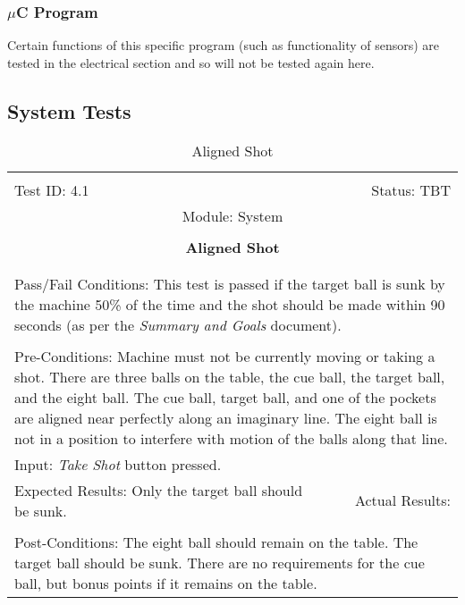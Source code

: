 \documentclass[titlepage]{article}
\begin{document}
\subsubsection{$\mu$C Program}
Certain functions of this specific program (such as functionality of sensors) are tested in the electrical section and so will not be tested again here.



\subsection{System Tests}
\begin{center}%
\begin{table}
\begin{tabular}{|l r|}\hline&\\[-2mm]
	Test ID: 4.1	&Status: TBT\\[-3mm]
	\multicolumn{2}{|c|}{Module: System}\\&\\
	\multicolumn{2}{|c|}{\textbf{\large{Aligned Shot}}}\\&\\\hline&\\[-3mm]
	\multicolumn{2}{|p{\textwidth}|}{Pass/Fail Conditions: This test is passed if the target ball is sunk by the machine 50\% of the time and the shot should be made within 90 seconds (as per the \textit{Summary and Goals} document).}\\[1mm]\hline&\\[-3mm]
	\multicolumn{2}{|p{\textwidth}|}{Pre-Conditions: Machine must not be currently moving or taking a shot. There are three balls on the table, the cue ball, the target ball, and the eight ball. The cue ball, target ball, and one of the pockets are aligned near perfectly along an imaginary line. The eight ball is not in a position to interfere with motion of the balls along that line.}\\[4mm]
	\multicolumn{2}{|p{\textwidth}|}{Input: \textit{Take Shot} button pressed.}\\[2mm]\hline
	\multicolumn{1}{|p{0.49\textwidth}}{Expected Results: Only the target ball should be sunk.}	&\multicolumn{1}{|p{0.45\textwidth}|}{Actual Results: }\\\hline&\\[-3mm]
	\multicolumn{2}{|p{\textwidth}|}{Post-Conditions: The eight ball should remain on the table. The target ball should be sunk. There are no requirements for the cue ball, but bonus points if it remains on the table.}\\\hline
\end{tabular}
\caption{Aligned Shot}
\end{table}
\end{center}
\end{document}
